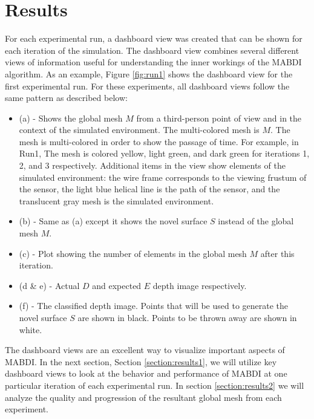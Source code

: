 \chapter{Results} \label{chapter:results}


For each experimental run, a dashboard view was created that can be shown for
each iteration of the simulation. The dashboard view combines several different
views of information useful for understanding the inner workings of the MABDI
algorithm. As an example, Figure \ref{fig:run1} shows the dashboard view for the
first experimental run. For these experiments, all dashboard views follow the
same pattern as described below:

\begin{itemize}
  \item (a) - Shows the global mesh $M$ from a third-person point of view and in
  the context of the simulated environment. The multi-colored mesh is $M$. The
  mesh is multi-colored in order to show the passage of time. For example, in
  Run1, The mesh is colored yellow, light green, and dark green for iterations
  1, 2, and 3 respectively. Additional items in the view show elements of the
  simulated environment: the wire frame corresponds to the viewing frustum of
  the sensor, the light blue helical line is the path of the sensor, and the
  translucent gray mesh is the simulated environment.
  \item (b) - Same as (a) except it shows the novel surface $S$ instead of
  the global mesh $M$.
  \item (c) - Plot showing the number of elements in the global mesh $M$
  after this iteration.
  \item (d \& e) - Actual $D$ and expected $E$ depth image
  respectively.
  \item (f) - The classified depth image. Points that will be used to generate
  the novel surface $S$ are shown in black. Points to be thrown away are shown
  in white.
\end{itemize}

The dashboard views are an excellent way to visualize important aspects of
MABDI. In the next section, Section \ref{section:results1}, we will utilize key
dashboard views to look at the behavior and performance of MABDI at one particular iteration of each experimental run. In section \ref{section:results2} we will analyze the
quality and progression of the resultant global mesh from each experiment.

